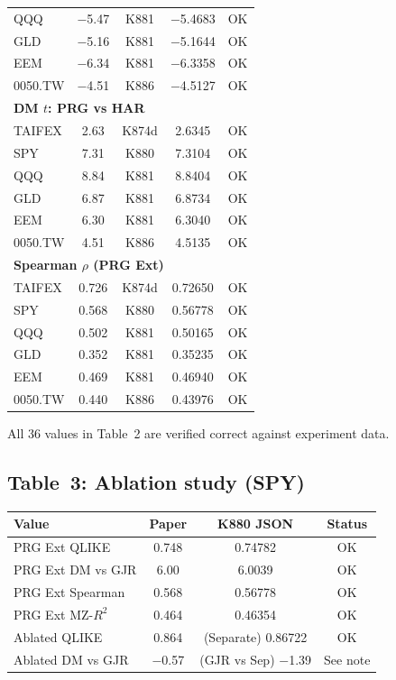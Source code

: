 \documentclass[12pt,a4paper]{article}
\begin{document}
\begin{longtable}{lcccc}
QQQ & $-$5.47 & K881 & $-$5.4683 & \textcolor{okgreen}{OK} \\
GLD & $-$5.16 & K881 & $-$5.1644 & \textcolor{okgreen}{OK} \\
EEM & $-$6.34 & K881 & $-$6.3358 & \textcolor{okgreen}{OK} \\
0050.TW & $-$4.51 & K886 & $-$4.5127 & \textcolor{okgreen}{OK} \\
\midrule
\multicolumn{5}{l}{\textbf{DM $t$: PRG vs HAR}} \\
TAIFEX & 2.63 & K874d & 2.6345 & \textcolor{okgreen}{OK} \\
SPY & 7.31 & K880 & 7.3104 & \textcolor{okgreen}{OK} \\
QQQ & 8.84 & K881 & 8.8404 & \textcolor{okgreen}{OK} \\
GLD & 6.87 & K881 & 6.8734 & \textcolor{okgreen}{OK} \\
EEM & 6.30 & K881 & 6.3040 & \textcolor{okgreen}{OK} \\
0050.TW & 4.51 & K886 & 4.5135 & \textcolor{okgreen}{OK} \\
\midrule
\multicolumn{5}{l}{\textbf{Spearman $\rho$ (PRG Ext)}} \\
TAIFEX & 0.726 & K874d & 0.72650 & \textcolor{okgreen}{OK} \\
SPY & 0.568 & K880 & 0.56778 & \textcolor{okgreen}{OK} \\
QQQ & 0.502 & K881 & 0.50165 & \textcolor{okgreen}{OK} \\
GLD & 0.352 & K881 & 0.35235 & \textcolor{okgreen}{OK} \\
EEM & 0.469 & K881 & 0.46940 & \textcolor{okgreen}{OK} \\
0050.TW & 0.440 & K886 & 0.43976 & \textcolor{okgreen}{OK} \\
\bottomrule
\end{longtable}

\noindent\textcolor{okgreen}{All 36 values in Table~2 are verified correct against experiment data.}

\subsection*{Table~3: Ablation study (SPY)}

\begin{longtable}{lccc}
\toprule
Value & Paper & K880 JSON & Status \\
\midrule
PRG Ext QLIKE & 0.748 & 0.74782 & \textcolor{okgreen}{OK} \\
PRG Ext DM vs GJR & 6.00 & 6.0039 & \textcolor{okgreen}{OK} \\
PRG Ext Spearman & 0.568 & 0.56778 & \textcolor{okgreen}{OK} \\
PRG Ext MZ-$R^2$ & 0.464 & 0.46354 & \textcolor{okgreen}{OK} \\
Ablated QLIKE & 0.864 & (Separate) 0.86722 & \textcolor{okgreen}{OK} \\
Ablated DM vs GJR & $-$0.57 & (GJR vs Sep) $-$1.39 & \textcolor{warncolor}{See note} \\
\bottomrule
\end{longtable}
\end{document}
